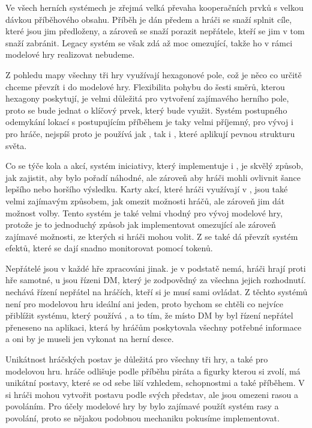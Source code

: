 Ve všech herních systémech je zřejmá velká převaha kooperačních prvků s velkou dávkou příběhového obsahu. Příběh je dán předem a hráči se snaží splnit cíle, které jsou jim předloženy, a zároveň se snaží porazit nepřátele, kteří se jim v tom snaží zabránit. Legacy systém  se však zdá až moc omezující, takže ho v rámci modelové hry realizovat nebudeme.

Z pohledu mapy všechny tři hry využívají hexagonové pole, což je něco co určitě chceme převzít i do modelové hry. Flexibilita pohybu do šesti směrů, kterou hexagony poskytují, je velmi důležitá pro vytvoření zajímavého herního pole, proto se bude jednat o klíčový prvek, který bude využit. Systém postupného odemykání lokací s postupujícím příběhem je taky velmi příjemný, pro vývoj i pro hráče, nejspíš proto je používá jak , tak i , které aplikují pevnou strukturu světa.

Co se týče kola a akcí, systém iniciativy, který implementuje  i \dnd{}, je skvělý způsob, jak zajistit, aby bylo pořadí náhodné, ale zároveň aby hráči mohli ovlivnit šance lepšího nebo horšího výsledku. Karty akcí, které hráči využívají v , jsou také velmi zajímavým způsobem, jak omezit možnosti hráčů, ale zároveň jim dát možnost volby. Tento systém je také velmi vhodný pro vývoj modelové hry, protože je to jednoduchý způsob jak implementovat omezující ale zároveň zajímavé možnosti, ze kterých si hráči mohou volit. Z  se také dá převzít systém efektů, které se dají snadno monitorovat pomocí tokenů.

Nepřátelé jsou v každé hře zpracováni jinak.  je v podstatě nemá, hráči hrají proti hře samotné, u \dnd{} jsou řízeni DM, který je zodpovědný za všechna jejich rozhodnutí.  nechává řízení nepřátel na hráčích, kteří si je musí sami ovládat. Z těchto systémů není pro modelovou hru ideální ani jeden, proto bychom se chtěli co nejvíce přiblížit systému, který používá \dnd{}, a to tím, že místo DM by byl řízení nepřátel přeneseno na aplikaci, která by hráčům poskytovala všechny potřebné informace a oni by je museli jen vykonat na herní desce.

Unikátnost hráčských postav je důležitá pro všechny tři hry, a také pro modelovou hru.  hráče odlišuje podle příběhu piráta a figurky kterou si zvolí,  má unikátní postavy, které se od sebe liší vzhledem, schopnostmi a také příběhem. V \dnd{} si hráči mohou vytvořit postavu podle svých představ, ale jsou omezeni rasou a povoláním. Pro účely modelové hry by bylo zajímavé použít systém rasy a povolání, proto se nějakou podobnou mechaniku pokusíme implementovat.

